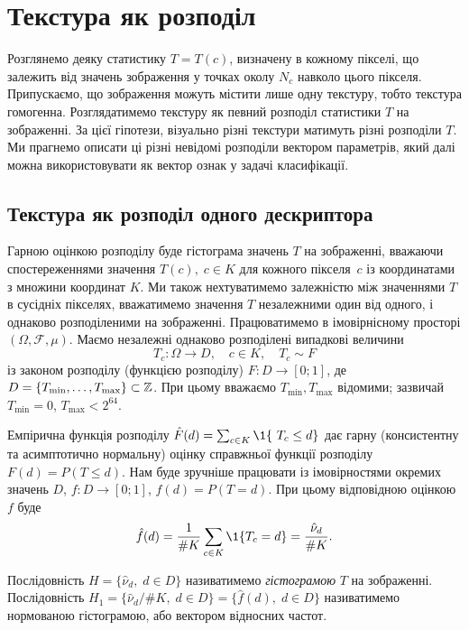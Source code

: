 
\section{Текстура як розподіл}\label{section1.2}\hfill

Розглянемо деяку статистику $T = T(c)$, визначену в кожному пікселі, що залежить від значень зображення у точках околу $N_c$ навколо цього пікселя.
Припускаємо, що зображення можуть містити лише одну текстуру, тобто текстура гомогенна.
Розглядатимемо текстуру як певний розподіл статистики $T$ на зображенні. 
За цієї гіпотези, візуально різні текстури матимуть різні розподіли $T$.
Ми прагнемо описати ці різні невідомі розподіли вектором параметрів, який далі можна використовувати як вектор ознак у задачі класифікації.

\subsection{Текстура як розподіл одного дескриптора}\label{section1.2a}\hfill

Гарною оцінкою розподілу буде гістограма значень $T$ на зображенні, вважаючи спостереженнями значення $T(c), \; c \in K$ для кожного пікселя~$c$ із координатами з множини координат $K$.
Ми також нехтуватимемо залежністю між значеннями $T$ в сусідніх пікселях, вважатимемо значення $T$ незалежними один від одного, і однаково розподіленими на зображенні.
Працюватимемо в імовірнісному просторі $(\Omega, \mathcal F, \mu)$.
Маємо незалежні однаково розподілені випадкові величини 
\[ T_c \colon \Omega \to D, \quad c \in K, \quad T_c \sim F \] 
із законом розподілу (функцією розподілу) $F \colon D \to [0;1]$, де $D = \{T_{\min},\dots,T_{\max}\} \subset \mathbb Z$.
При цьому вважаємо $T_{\min}, T_{\max}$ відомими; зазвичай $T_{\min} = 0$, $T_{\max} < 2^{64}$.

Емпірична функція розподілу $\hat F(d) = \sum_{c\in K} \1\{\ T_c \le d \}$
дає гарну (консистентну та асимптотично нормальну) оцінку справжньої функції розподілу $F(d) = P(T \le d)$.
Нам буде зручніше працювати із імовірностями окремих значень $D$, $f \colon D \to [0;1]$, $f(d) = P(T = d)$.
При цьому відповідною оцінкою $f$ буде 
\[\hat f(d) = \frac{1}{\# K}\sum_{c\in K}\1\{T_c = d\} = \frac{\hat\nu_d}{\# K}.\]

Послідовність $H = \{ \hat \nu_d, \; d\in D \}$ називатимемо \textit{гістограмою} $T$ на зображенні.
Послідовність $H_1 = \{ \hat \nu_d / \# K, \; d\in D \} = \{\hat f(d), \; d\in D\}$ називатимемо нормованою гістограмою, або вектором відносних частот.

